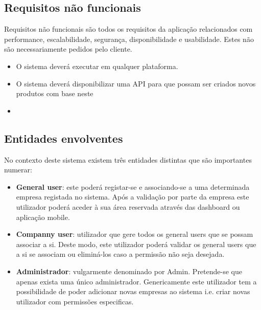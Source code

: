 \subsection{Requisitos não funcionais}


Requisitos não funcionais são todos os requisitos da aplicação relacionados com
performance, escalabilidade, segurança, disponibilidade e usabilidade. Estes não são
necessariamente pedidos pelo cliente. 


\begin{itemize}
	\item O sistema deverá executar em qualquer plataforma.
	
	\item O sistema deverá disponibilizar uma API para que possam ser criados novos produtos com base neste 
	
	\item 
	
\end{itemize}








\subsection{Entidades envolventes}


No contexto deste sistema existem três entidades distintas que são importantes numerar: 

\begin{itemize}
	
	\item \textbf{General user}: este poderá registar-se e associando-se a uma determinada empresa registada no sistema. Após a validação por parte da empresa este utilizador poderá aceder à sua área reservada através das dashboard ou aplicação mobile. 
	
	\item \textbf{Companny user}: utilizador que gere todos os general users que se possam associar a si. Deste modo, este utilizador poderá validar os general users que a si se associam ou eliminá-los caso a permissão não seja desejada.  
	
	\item \textbf{Administrador}: vulgarmente denominado por Admin. Pretende-se que apenas exista uma único administrador. Genericamente este utilizador tem a possibilidade de poder adicionar novas empresas ao sistema i.e. criar novas utilizador com permissões especificas. 
	
\end{itemize}



